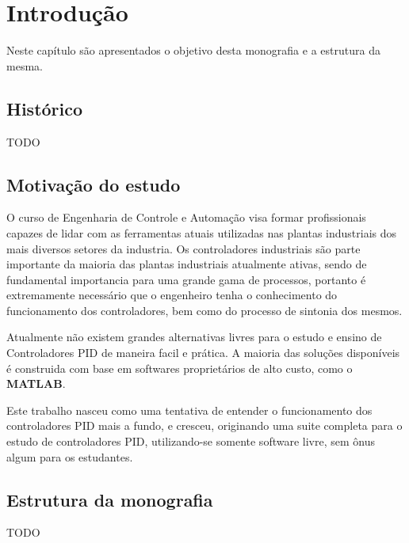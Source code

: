 \chapter{Introdução\label{cap:introducao}}

Neste capítulo são apresentados o objetivo desta monografia e a estrutura
da mesma.

\section{Histórico}

    TODO


\section{Motivação do estudo}

    O curso de Engenharia de Controle e Automação visa formar profissionais
    capazes de lidar com as ferramentas atuais utilizadas nas plantas industriais
    dos mais diversos setores da industria. Os controladores industriais são
    parte importante da maioria das plantas industriais atualmente ativas,
    sendo de fundamental importancia para uma grande gama de processos, portanto
    é extremamente necessário que o engenheiro tenha o conhecimento do funcionamento
    dos controladores, bem como do processo de sintonia dos mesmos.
    
    Atualmente não existem grandes alternativas livres para o estudo e ensino
    de Controladores PID de maneira facil e prática. A maioria das soluções
    disponíveis é construida com base em softwares proprietários de alto custo,
    como o \textbf{MATLAB}.
    
    Este trabalho nasceu como uma tentativa de entender o funcionamento dos
    controladores PID mais a fundo, e cresceu, originando uma suite completa
    para o estudo de controladores PID, utilizando-se somente software livre,
    sem ônus algum para os estudantes.


\section{Estrutura da monografia}

    TODO
